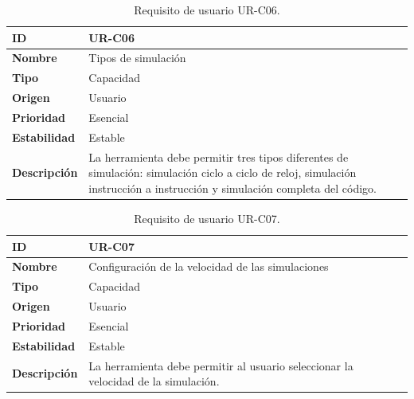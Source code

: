 \begin{center}
\begin{table}[htbp]
\centering
\begin{tabular}{@{}p{2.5cm} p{9cm}@{}} 
\toprule
\textbf{ID} 				& UR-C06 \\
\midrule
\textbf{Nombre} 			& Tipos de simulación \\
\midrule
\textbf{Tipo} 			& Capacidad \\
\midrule
\textbf{Origen} 			& Usuario \\
\midrule
\textbf{Prioridad}		& Esencial \\
\midrule
\textbf{Estabilidad} 		& Estable \\
\midrule
\textbf{Descripción} 	& La herramienta debe permitir tres tipos diferentes de simulación: simulación ciclo a ciclo de reloj, simulación instrucción a instrucción y simulación completa del código.\\
\bottomrule
\end{tabular}
\caption{Requisito de usuario UR-C06.}
\label{tab:urc06}
\end{table}
\end{center}

\begin{center}
\begin{table}[htbp]
\centering
\begin{tabular}{@{}p{2.5cm} p{9cm}@{}} 
\toprule
\textbf{ID} 				& UR-C07 \\
\midrule
\textbf{Nombre} 			& Configuración de la velocidad de las simulaciones \\
\midrule
\textbf{Tipo} 			& Capacidad \\
\midrule
\textbf{Origen} 			& Usuario \\
\midrule
\textbf{Prioridad}		& Esencial \\
\midrule
\textbf{Estabilidad} 		& Estable \\
\midrule
\textbf{Descripción} 	& La herramienta debe permitir al usuario seleccionar la velocidad de la simulación. \\
\bottomrule
\end{tabular}
\caption{Requisito de usuario UR-C07.}
\label{tab:urc07}
\end{table}
\end{center}

